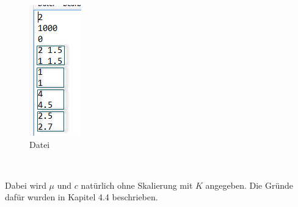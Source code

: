 \documentclass[11pt, a4paper, german]{article}
\theoremstyle{plain}
\begin{document}
	\begin{center}
	\begin{minipage}{0.15\textwidth}
		\begin{figure}[H]
			\centering
			\includegraphics[width=1\linewidth]{./Pictures/Parameter}
			\caption[Parameter]{Datei}
			\label{Parameter}
		\end{figure}
	\end{minipage}
	$ \quad $
	\begin{minipage}{0.6\textwidth}
		Dabei wird $ \mu $ und $ c $ natürlich ohne Skalierung mit $ K $ angegeben. Die Gründe dafür wurden in Kapitel 4.4 beschrieben.\\
		

\end{minipage}
\end{center}
\end{document}
